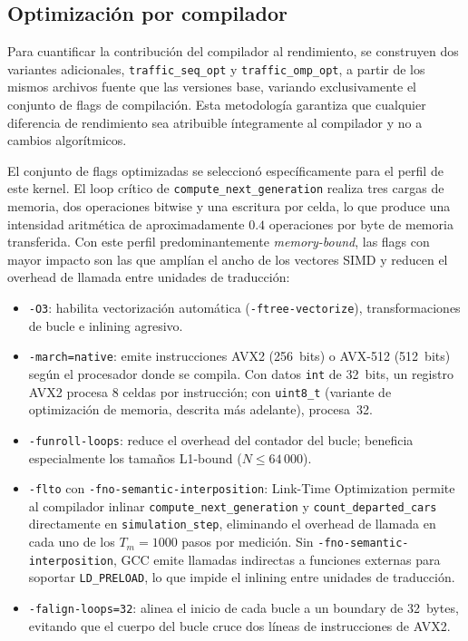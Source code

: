 \subsection{Optimización por compilador}

Para cuantificar la contribución del compilador al rendimiento, se
construyen dos variantes adicionales, \texttt{traffic\_seq\_opt} y
\texttt{traffic\_omp\_opt}, a partir de los mismos archivos
fuente que las versiones base, variando exclusivamente el conjunto de
flags de compilación. Esta metodología garantiza que cualquier diferencia
de rendimiento sea atribuible íntegramente al compilador y no a cambios
algorítmicos.

El conjunto de flags optimizadas se seleccionó específicamente para el
perfil de este kernel. El loop crítico de \texttt{compute\_next\_generation}
realiza tres cargas de memoria, dos operaciones bitwise y una escritura por
celda, lo que produce una intensidad aritmética de aproximadamente $0.4$
operaciones por byte de memoria transferida. Con este perfil predominantemente
\emph{memory-bound}, las flags con mayor impacto son las que amplían el
ancho de los vectores SIMD y reducen el overhead de llamada entre
unidades de traducción:

\begin{itemize}
    \item \texttt{-O3}: habilita vectorización automática
          (\texttt{-ftree-vectorize}), transformaciones de bucle e
          inlining agresivo.

    \item \texttt{-march=native}: emite instrucciones AVX2 (256~bits) o
          AVX-512 (512~bits) según el procesador donde se compila.
          Con datos \texttt{int} de 32~bits, un registro AVX2 procesa 8
          celdas por instrucción; con \texttt{uint8\_t} (variante de
          optimización de memoria, descrita más adelante), procesa~32.

    \item \texttt{-funroll-loops}: reduce el overhead del contador del
          bucle; beneficia especialmente los tamaños L1-bound ($N \leq
          64\,000$).

    \item \texttt{-flto} con \texttt{-fno-semantic-interposition}:
          Link-Time Optimization permite al compilador inlinar
          \texttt{compute\_next\_generation} y
          \texttt{count\_departed\_cars} directamente en
          \texttt{simulation\_step}, eliminando el overhead de llamada
          en cada uno de los $T_m = 1000$ pasos por medición. Sin
          \texttt{-fno-semantic-interposition}, GCC emite llamadas
          indirectas a funciones externas para soportar
          \texttt{LD\_PRELOAD}, lo que impide el inlining entre unidades
          de traducción.

    \item \texttt{-falign-loops=32}: alinea el inicio de cada bucle a un
          boundary de 32~bytes, evitando que el cuerpo del bucle cruce
          dos líneas de instrucciones de AVX2.
\end{itemize}

